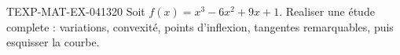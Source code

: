 \begin{exercice}{TEXP-MAT-EX-041}{3}{20}
Soit $f(x) = x^3 - 6x^2 + 9x + 1$. Realiser une étude complete : variations, convexité, points d'inflexion, tangentes remarquables, puis esquisser la courbe.

\end{exercice}
